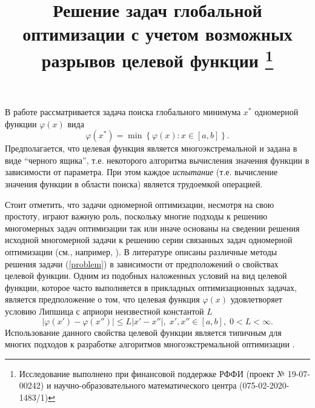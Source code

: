 \documentclass[11pt, oneside, a4paper]{article}
\begin{document}
\setcounter{page}{1}



\title{
Решение задач глобальной оптимизации с учетом возможных разрывов целевой функции
\footnote{Исследование выполнено при финансовой поддержке РФФИ (проект № 19-07-00242) и научно-образовательного математического центра (075-02-2020-1483/1)}
}





\bigskip

В работе рассматривается задача поиска глобального минимума $x^*$ одномерной функции $\varphi(x)$ вида
\begin{equation}\label{problem}
\varphi(x^*)=\min\left\{\varphi(x):x\in\left[a,b\right]\right\}.
\end{equation}
Предполагается, что целевая функция является многоэкстремальной и задана в виде ``черного ящика'', т.е. некоторого алгоритма вычисления значения функции в зависимости от параметра. При этом каждое \textit{испытание} (т.е. вычисление значения функции в области поиска) является трудоемкой операцией.  

Стоит отметить, что задачи одномерной оптимизации, несмотря на свою простоту, играют важную роль, поскольку многие подходы к решению многомерных задач оптимизации так или иначе основаны на сведении решения исходной многомерной задачи к решению серии связанных задач одномерной оптимизации (см., например, \cite{Grishagin2007,Sergeyev2008}).
В литературе описаны различные методы решения задачи (\ref{problem}) в зависимости от предположений о свойствах целевой функции. Одним из подобных наложенных условий на вид целевой функции, которое часто выполняется в прикладных оптимизационных задачах, является предположение о том, что целевая функция $\varphi(x)$ удовлетворяет условию Липшица с априори неизвестной константой $L$
\[
\left|\varphi(x')-\varphi(x'')\right|\leq L\left|x'-x''\right|,\; x',x'' \in [a,b],\; 0<L<\infty.
\]
Использование данного свойства целевой функции является типичным для многих подходов к разработке алгоритмов многоэкстремальной оптимизации \cite{Evtushenko2009,Elsakov}. 
\end{document}
